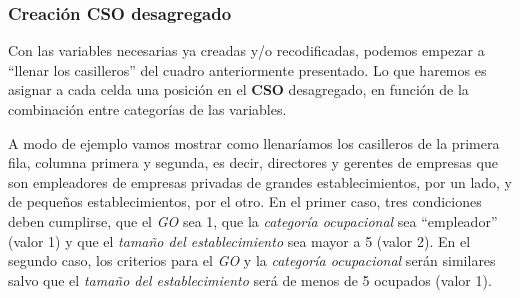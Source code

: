 \documentclass[
]{article}
\newenvironment{Shaded}{\begin{snugshade}}{\end{snugshade}}
\newcommand{\AttributeTok}[1]{\textcolor[rgb]{0.13,0.29,0.53}{#1}}
\newcommand{\ConstantTok}[1]{\textcolor[rgb]{0.56,0.35,0.01}{#1}}
\newcommand{\DecValTok}[1]{\textcolor[rgb]{0.00,0.00,0.81}{#1}}
\newcommand{\FunctionTok}[1]{\textcolor[rgb]{0.13,0.29,0.53}{\textbf{#1}}}
\newcommand{\NormalTok}[1]{#1}
\newcommand{\OtherTok}[1]{\textcolor[rgb]{0.56,0.35,0.01}{#1}}
\newcommand{\SpecialCharTok}[1]{\textcolor[rgb]{0.81,0.36,0.00}{\textbf{#1}}}
\newcommand{\StringTok}[1]{\textcolor[rgb]{0.31,0.60,0.02}{#1}}
\begin{document}
\begin{Shaded}
\end{Shaded}

\hypertarget{creaciuxf3n-cso-desagregado}{%
\subsubsection{Creación CSO desagregado}\label{creaciuxf3n-cso-desagregado}}

Con las variables necesarias ya creadas y/o recodificadas, podemos empezar a ``llenar los casilleros'' del cuadro anteriormente presentado. Lo que haremos es asignar a cada celda una posición en el \textbf{CSO} desagregado, en función de la combinación entre categorías de las variables.

A modo de ejemplo vamos mostrar como llenaríamos los casilleros de la primera fila, columna primera y segunda, es decir, directores y gerentes de empresas que son empleadores de empresas privadas de grandes establecimientos, por un lado, y de pequeños establecimientos, por el otro. En el primer caso, tres condiciones deben cumplirse, que el \emph{GO} sea 1, que la \emph{categoría ocupacional} sea ``empleador'' (valor 1) y que el \emph{tamaño del establecimiento} sea mayor a 5 (valor 2). En el segundo caso, los criterios para el \emph{GO} y la \emph{categoría ocupacional} serán similares salvo que el \emph{tamaño del establecimiento} será de menos de 5 ocupados (valor 1).
\end{document}
